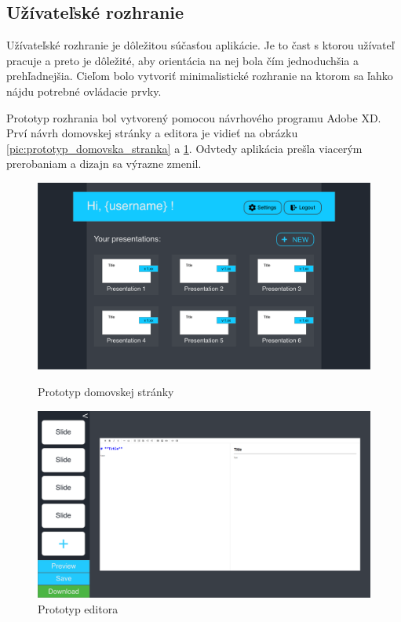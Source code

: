\subsection{Užívateľské rozhranie}
Užívateľské rozhranie je dôležitou súčasťou aplikácie. Je to čast s ktorou užívateľ pracuje a preto je dôležité, aby orientácia na nej bola čím jednoduchšia a prehľadnejšia. Cieľom bolo vytvoriť minimalistické rozhranie na ktorom sa ľahko nájdu potrebné ovládacie prvky.

Prototyp rozhrania bol vytvorený pomocou návrhového programu Adobe XD. Prví návrh domovskej stránky a editora je vidieť na obrázku \ref{pic:prototyp_domovska_stranka} a \ref{pic:prototyp_editor}. Odvtedy aplikácia prešla viacerým prerobaniam a dizajn sa výrazne zmenil.

\begin{figure}[!hbt]
\centering
\begin{minipage}{.5\textwidth}
  \centering
  \includegraphics[scale=0.1]{obrazky/prototyp_domovska_stranka.png}
  \caption{Prototyp domovskej stránky}
  \label{pic:prototyp_domovska_stranka}
\end{minipage}%
\begin{minipage}{.5\textwidth}
  \centering
  \includegraphics[scale=0.1]{obrazky/prototyp_editor.png}
  \caption{Prototyp editora}
  \label{pic:prototyp_editor}
\end{minipage}
\end{figure}

